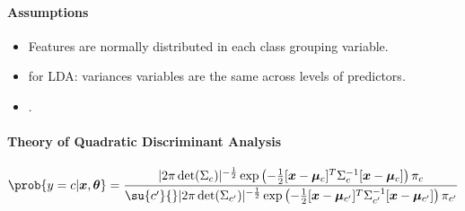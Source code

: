 \paragraph{Assumptions}
\begin{itemize}
    \item Features are normally distributed in each class
        grouping variable.
    \item {} for LDA: variances  
        variables are the same across levels of predictors.
    \item {}.
\end{itemize}


\paragraph{Theory of Quadratic Discriminant Analysis}
\begin{center}
    $\prob{y=c|\bm{x},\bm{\theta}} = \dfrac{|2\pi\det(\Sigma_{c})|^{
    -\frac{1}{2}}\exp\left(-\frac{1}{2}[\bm{x}-\bm{\mu}_{c}]^{T}\Sigma_{
    c}^{-1}[\bm{x}-\bm{\mu}_{c}]\right)\pi_{c}}{\su{c'}{}|2\pi\det(\Sigma_{c'})
    |^{-\frac{1}{2}}\exp\left(-\frac{1}{2}[\bm{x}-\bm{\mu}_{c'}]^{T}
    \Sigma_{c'}^{-1}[\bm{x}-\bm{\mu}_{c'}]\right)\pi_{c'}}$
\end{center}

